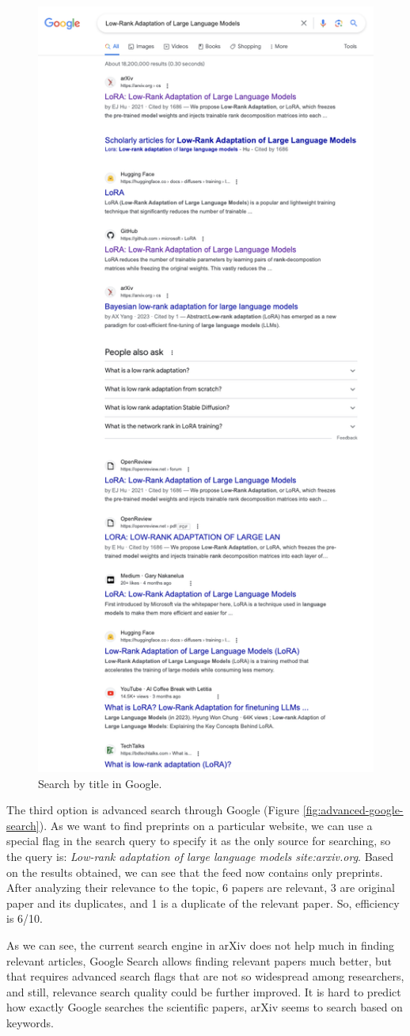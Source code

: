 \documentclass{article}
\begin{document}
    \begin{figure}[H]
        \centering
        \includegraphics[width=0.6\linewidth]{img/search_google.png}
        \caption{Search by title in Google.}
        \label{fig:google-search}
    \end{figure}

    The third option is advanced search through Google (Figure \ref{fig:advanced-google-search}). As we want to find preprints on a particular website, we can use a special flag in the search query to specify it as the only source for searching, so the query is: \textit{Low-rank adaptation of large language models site:arxiv.org}. Based on the results obtained, we can see that the feed now contains only preprints. After analyzing their relevance to the topic, 6 papers are relevant, 3 are original paper and its duplicates, and 1 is a duplicate of the relevant paper. So, efficiency is 6/10.

    As we can see, the current search engine in arXiv does not help much in finding relevant articles, Google Search allows finding relevant papers much better, but that requires advanced search flags that are not so widespread among researchers, and still, relevance search quality could be further improved. It is hard to predict how exactly Google searches the scientific papers, arXiv seems to search based on keywords.
    
\end{document}
